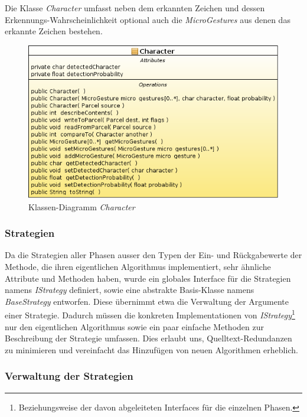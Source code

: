 Die Klasse \emph{Character} umfasst neben dem erkannten Zeichen und dessen Erkennungs-Wahrscheinlichkeit optional auch die \emph{MicroGestures} aus denen das erkannte Zeichen bestehen.

\begin{figure}[h!]
   \centering
   \includegraphics[scale=0.5]{img/uml_cd_char} 
   \caption{Klassen-Diagramm \emph{Character}}
   \label{fig:cd_character}
\end{figure}

\subsubsection{Strategien}

Da die Strategien aller Phasen ausser den Typen der Ein- und Rückgabewerte der Methode, die ihren eigentlichen Algorithmus implementiert, sehr ähnliche Attribute und Methoden haben, wurde ein globales Interface für die Strategien namens \emph{IStrategy} definiert, sowie eine abstrakte Basis-Klasse namens \emph{BaseStrategy} entworfen. Diese übernimmt etwa die Verwaltung der Argumente einer Strategie. Dadurch müssen die konkreten Implementationen von \emph{IStrategy}\footnote{Beziehungsweise der davon abgeleiteten Interfaces für die einzelnen Phasen.} nur den eigentlichen Algorithmus sowie ein paar einfache Methoden zur Beschreibung der Strategie umfassen. Dies erlaubt uns, Quelltext-Redundanzen zu minimieren und vereinfacht das Hinzufügen von neuen Algorithmen erheblich.

\subsubsection{Verwaltung der Strategien}

